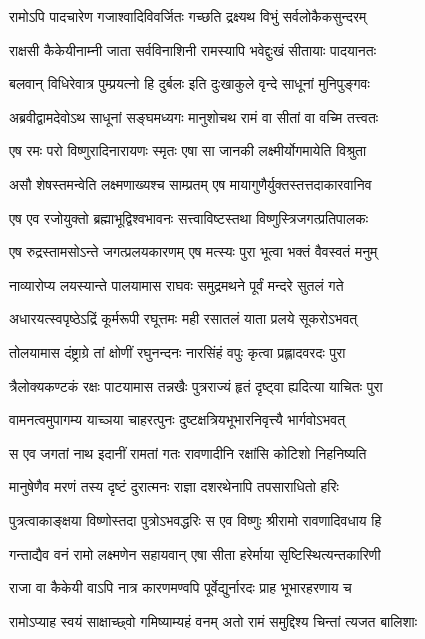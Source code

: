 \twolineshloka
{रामोऽपि पादचारेण गजाश्वादिविवर्जितः}
{गच्छति द्रक्ष्यथ विभुं सर्वलोकैकसुन्दरम्} %

\twolineshloka
{राक्षसी कैकेयीनाम्नी जाता सर्वविनाशिनी}
{रामस्यापि भवेद्दुःखं सीतायाः पादयानतः} %

\twolineshloka
{बलवान् विधिरेवात्र पुम्प्रयत्नो हि दुर्बलः}
{इति दुःखाकुले वृन्दे साधूनां मुनिपुङ्गवः} %

\twolineshloka
{अब्रवीद्वामदेवोऽथ साधूनां सङ्घमध्यगः}
{मानुशोचथ रामं वा सीतां वा वच्मि तत्त्वतः} %

\twolineshloka
{एष रमः परो विष्णुरादिनारायणः स्मृतः}
{एषा सा जानकी लक्ष्मीर्योगमायेति विश्रुता} %

\twolineshloka
{असौ शेषस्तमन्वेति लक्ष्मणाख्यश्च साम्प्रतम्}
{एष मायागुणैर्युक्तस्तत्तदाकारवानिव} %

\twolineshloka
{एष एव रजोयुक्तो ब्रह्माभूद्विश्वभावनः}
{सत्त्वाविष्टस्तथा विष्णुस्त्रिजगत्प्रतिपालकः} %

\twolineshloka
{एष रुद्रस्तामसोऽन्ते जगत्प्रलयकारणम्}
{एष मत्स्यः पुरा भूत्वा भक्तं वैवस्वतं मनुम्} %

\twolineshloka
{नाव्यारोप्य लयस्यान्ते पालयामास राघवः}
{समुद्रमथने पूर्वं मन्दरे सुतलं गते} %

\twolineshloka
{अधारयत्स्वपृष्ठेऽद्रिं कूर्मरूपी रघूत्तमः}
{मही रसातलं याता प्रलये सूकरोऽभवत्} %

\twolineshloka
{तोलयामास दंष्ट्राग्रे तां क्षोणीं रघुनन्दनः}
{नारसिंहं वपुः कृत्वा प्रह्लादवरदः पुरा} %

\twolineshloka
{त्रैलोक्यकण्टकं रक्षः पाटयामास तन्नखैः}
{पुत्रराज्यं हृतं दृष्ट्वा ह्यदित्या याचितः पुरा} %

\twolineshloka
{वामनत्वमुपागम्य याच्ञया चाहरत्पुनः}
{दुष्टक्षत्रियभूभारनिवृत्त्यै भार्गवोऽभवत्} %

\twolineshloka
{स एव जगतां नाथ इदानीं रामतां गतः}
{रावणादीनि रक्षांसि कोटिशो निहनिष्यति} %

\twolineshloka
{मानुषेणैव मरणं तस्य दृष्टं दुरात्मनः}
{राज्ञा दशरथेनापि तपसाराधितो हरिः} %

\twolineshloka
{पुत्रत्वाकाङ्क्षया विष्णोस्तदा पुत्रोऽभवद्धरिः}
{स एव विष्णुः श्रीरामो रावणादिवधाय हि} %

\twolineshloka
{गन्ताद्यैव वनं रामो लक्ष्मणेन सहायवान्}
{एषा सीता हरेर्माया सृष्टिस्थित्यन्तकारिणी} %

\twolineshloka
{राजा वा कैकेयी वाऽपि नात्र कारणमण्वपि}
{पूर्वेद्युर्नारदः प्राह भूभारहरणाय च} %

\twolineshloka
{रामोऽप्याह स्वयं साक्षाच्छ्वो गमिष्याम्यहं वनम्}
{अतो रामं समुद्दिश्य चिन्तां त्यजत बालिशाः} %

